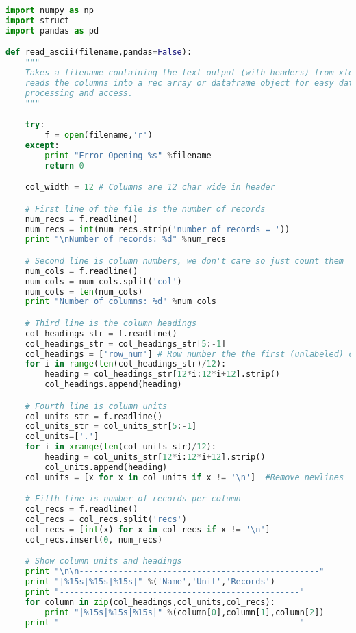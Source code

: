 \begin{lstlisting}[language=Python]
import numpy as np
import struct
import pandas as pd

def read_ascii(filename,pandas=False):
    """
    Takes a filename containing the text output (with headers) from xlook and
    reads the columns into a rec array or dataframe object for easy data
    processing and access.
    """

    try:
        f = open(filename,'r')
    except:
        print "Error Opening %s" %filename
        return 0

    col_width = 12 # Columns are 12 char wide in header

    # First line of the file is the number of records
    num_recs = f.readline()
    num_recs = int(num_recs.strip('number of records = '))
    print "\nNumber of records: %d" %num_recs

    # Second line is column numbers, we don't care so just count them
    num_cols = f.readline()
    num_cols = num_cols.split('col')
    num_cols = len(num_cols)
    print "Number of columns: %d" %num_cols

    # Third line is the column headings
    col_headings_str = f.readline()
    col_headings_str = col_headings_str[5:-1]
    col_headings = ['row_num'] # Row number the the first (unlabeled) column
    for i in range(len(col_headings_str)/12):
        heading = col_headings_str[12*i:12*i+12].strip()
        col_headings.append(heading)

    # Fourth line is column units
    col_units_str = f.readline()
    col_units_str = col_units_str[5:-1]
    col_units=['.']
    for i in xrange(len(col_units_str)/12):
        heading = col_units_str[12*i:12*i+12].strip()
        col_units.append(heading)
    col_units = [x for x in col_units if x != '\n']  #Remove newlines

    # Fifth line is number of records per column
    col_recs = f.readline()
    col_recs = col_recs.split('recs')
    col_recs = [int(x) for x in col_recs if x != '\n']
    col_recs.insert(0, num_recs)

    # Show column units and headings
    print "\n\n-------------------------------------------------"
    print "|%15s|%15s|%15s|" %('Name','Unit','Records')
    print "-------------------------------------------------"
    for column in zip(col_headings,col_units,col_recs):
        print "|%15s|%15s|%15s|" %(column[0],column[1],column[2])
    print "-------------------------------------------------"


\end{lstlisting}
